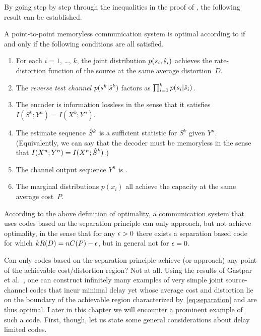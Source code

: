 By going step by step through the inequalities in the proof of
, the following result can be established. 

\begin{theorem}
  \label{thm:optimalityconditions}
  A point-to-point memoryless communication system is optimal according to
   if and only if the following conditions are all satisfied.
  \begin{enumerate}
    \item For each $i = 1$, \dots, $k$, the joint distribution $p(s_i,{\hat{s}}_i)$
      achieves the rate-distortion function of the source at the same average
      distortion~$D$.
    \item The \emph{reverse test channel} $p(s^k|{\hat{s}}^k)$ factors as
      $\prod_{i=1}^k p(s_i | {\hat{s}}_i)$. 
    \item The encoder is information lossless in the sense that it satisfies
      $I(S^k;Y^n) = I(X^k; Y^n)$. 
    \item The estimate sequence ${\hat{S}}^k$ is a sufficient statistic for $S^k$
      given $Y^n$. (Equivalently, we can say that the decoder must be memoryless
      in the sense that $I(X^n;Y^n) = I(X^n;{\hat{S}}^k)$.)
    \item The channel output sequence $Y^n$ is \iid.
    \item The marginal distributions $p(x_i)$ all achieve the capacity at the
      same average cost~$P$.
  \end{enumerate}
\end{theorem}


According to the above definition of optimality, a communication system that
uses codes based on the separation principle can only approach, but not achieve
optimality, in the sense that for any $\epsilon > 0$ there exists a separation based
code for which $kR(D) = nC(P) - \epsilon$, but in general not for $\epsilon = 0$. 

Can only codes based on the separation principle achieve (or approach) any point
of the achievable cost\slash distortion region? Not at all. Using the results of
Gastpar et al.~\cite{GastparRV2003}, one can construct infinitely many examples
of very simple joint source-channel codes that incur minimal delay yet whose
average cost and distortion lie on the boundary of the achievable region
characterized by~\eqref{eq:separation} and are thus optimal. Later
in this chapter we will encounter a prominent example of such a code. First,
though, let us state some general considerations about delay limited codes.


